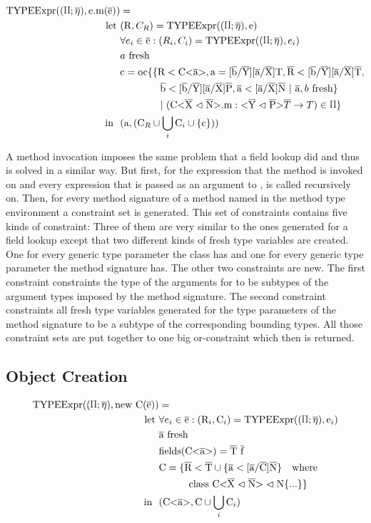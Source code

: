 \begin{align*}
    \texpr{\text{e.m}( \ot{e} )} &= \\
    \text{let} \ &( \text{R}, C_R ) = \texpr{\text{e}} \\
    &\forall{e_i} \in \ot{e} : ( R_i, C_i ) = \texpr{e_i} \\
    &\fresh{a} \\
    &\text{c} = \text{oc} \{ \{ \text{R} < \text{C<} \ot{a} \text{>}, \text{a} = \tsxsnd{b}{Y}{a}{X}{T}, \ot{R} < \tsxsnsd{b}{Y}{a}{X}{T}, \\
    & \quad \quad \quad \quad \ot{b} < \tsxsnsd{b}{Y}{a}{X}{P}, \ot{a} < \tsxsns{a}{X}{N} \ | \ \ot{a}, \fresh{b} \} \\
    & \quad \quad \quad \quad | \ ( \cm : \yp \oto{T} ) \in \sprod{0.7} \}\\
    \text{in} \ \ & (\text{a}, (\text{C}_R \cup \bigcup_{i} \text{C}_i \cup \{ \text{c} \} ))
\end{align*}

A method invocation imposes the same problem that a field lookup did and thus is solved in a similar way. But first, for the
expression that the method  is invoked on and every expression that is passed as an argument to , 
is called recursively on. Then, for every method signature of a method named  in the method type environment a constraint
set is generated. This set of constraints contains five kinds of constraint: Three of them are very similar to the ones generated for a
field lookup except that two different kinds of fresh type variables are created. One for every generic type parameter the class has and
one for every generic type parameter the method signature has. The other two constraints are new. The first constraint constraints the type of the arguments for  to be subtypes of the
argument types imposed by the method signature. The second constraint constraints all fresh type variables generated for the type parameters
of the method signature to be a subtype of the corresponding bounding types. All those constraint sets are put together to one big or-constraint which then is returned.

\subsection{Object Creation}

\begin{align*}
    \texpr{\text{new} \ \text{C}(\ot{e})} &=\\
    \text{let} \ & \forall{e_i} \in \ot{e} : (\text{R}_i, \text{C}_i) = \texpr{\text{e}_i}\\
    & \fresh{\ot{a}}\\
    & \text{fields}(\nvt{C}{a}) = \ot{T} \ \ot{f}\\
    & \text{C} = \{ \ot{R} < \ot{T} \cup \{ \ot{a} < \tsxsns{a}{C}{N} \} \quad \text{where} \\
    & \quad \quad \quad \classheader \{ ... \} \}\\
    \text{in} \ \ & ( \nvt{C}{a}, \text{C} \cup \bigcup_{i} \text{C}_i )
\end{align*}

